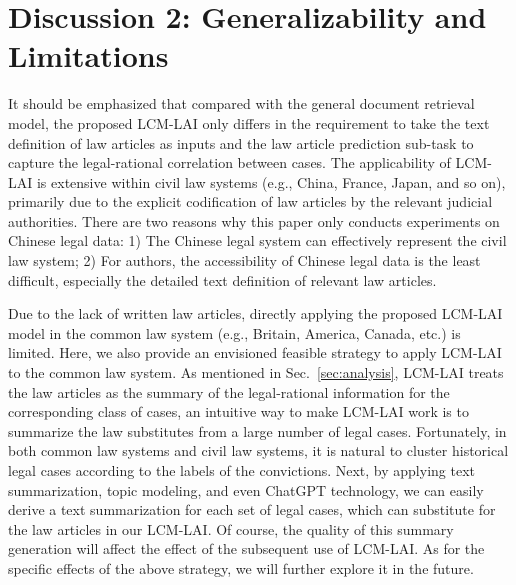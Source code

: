 \section{Discussion 2: Generalizability and Limitations}
It should be emphasized that compared with the general document retrieval model, the proposed LCM-LAI only differs in the requirement to take the text definition of law articles as inputs and the law article prediction sub-task to capture the legal-rational correlation between cases. The applicability of LCM-LAI is extensive within civil law systems (e.g., China, France, Japan, and so on), primarily due to the explicit codification of law articles by the relevant judicial authorities. There are two reasons why this paper only conducts experiments on Chinese legal data: 1) The Chinese legal system can effectively represent the civil law system; 2) For authors, the accessibility of Chinese legal data is the least difficult, especially the detailed text definition of relevant law articles.


Due to the lack of written law articles, directly applying the proposed LCM-LAI model in the common law system (e.g., Britain, America, Canada, etc.) is limited.
Here, we also provide an envisioned feasible strategy to apply LCM-LAI to the common law system.
As mentioned in Sec.~\ref{sec:analysis}, LCM-LAI treats the law articles as the summary of the legal-rational information for the corresponding class of cases, an intuitive way to make LCM-LAI work is to summarize the law substitutes from a large number of legal cases.
Fortunately, in both common law systems and civil law systems, it is natural to cluster historical legal cases according to the labels of the convictions.
Next, by applying text summarization, topic modeling, and even ChatGPT technology, we can easily derive a text summarization for each set of legal cases, which can substitute for the law articles in our LCM-LAI.
Of course, the quality of this summary generation will affect the effect of the subsequent use of LCM-LAI.
As for the specific effects of the above strategy, we will further explore it in the future.



